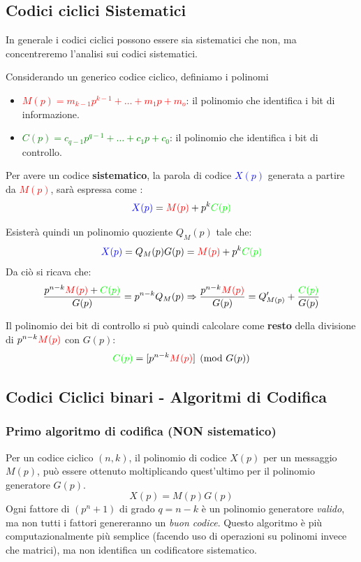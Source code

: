 \subsection{Codici ciclici Sistematici}
In generale i codici ciclici possono essere sia sistematici che non, ma concentreremo l'analisi sui codici sistematici.

Considerando un generico codice ciclico, definiamo i polinomi
\begin{itemize}
    \item \textcolor{red}{$M(p) = m_{k-1}p^{k-1}+ \dots + m_1p+m_o$}: il polinomio che identifica i bit di informazione.
    
    \item \textcolor{green}{$C(p) = c_{q-1}p^{q-1}+ \dots + c_1p+c_0$}: il polinomio che identifica i bit di controllo.
\end{itemize}
Per avere un codice \textbf{sistematico}, la parola di codice \textcolor{blue}{$X(p)$} generata a partire da \textcolor{red}{$M(p)$}, sarà espressa come :
\[\textcolor{blue}{X(p)} =\textcolor{red}{M(p)} + p^k \textcolor{green}{C(p)}\]

Esisterà quindi un polinomio quoziente $Q_M(p)$ tale che:
\[\textcolor{blue}{X(p)} = Q_M(p)G(p)= \textcolor{red}{M(p)}+ p^k\textcolor{green}{C(p)}\]
Da ciò si ricava che:
\[\frac{p^{n-k}\textcolor{red}{M(p)} + \textcolor{green}{C(p)}}{G(p)} = p^{n-k}Q_M(p) \Rightarrow \frac{p^{n-k}\textcolor{red}{M(p)}}{G(p)} = Q'_{M(p)}+ \frac{\textcolor{green}{C(p)}}{G(p)}\]

Il polinomio dei bit di controllo si può quindi calcolare come \textbf{resto} della divisione di $p^{n-k}\textcolor{red}{M(p)}$ con $G(p)$:
\[\textcolor{green}{C(p)}= [ p^{n-k}\textcolor{red}{M(p)} ] \pmod{G(p)}\]

\subsection{Codici Ciclici binari - Algoritmi di Codifica}
\subsubsection{Primo algoritmo di codifica (NON sistematico)}
Per un codice ciclico $(n,k)$, il polinomio di codice $X(p)$ per un messaggio $M(p)$, può essere ottenuto moltiplicando quest'ultimo per il polinomio generatore $G(p)$.
\[X(p) = M(p)G(p)\]
Ogni fattore di $(p^n+1)$ di grado $q=n-k$ è un polinomio generatore \textit{valido}, ma non tutti i fattori genereranno un \textit{buon codice}.
Questo algoritmo è più computazionalmente più semplice (facendo uso di operazioni su polinomi invece che matrici), ma non identifica un codificatore sistematico.

